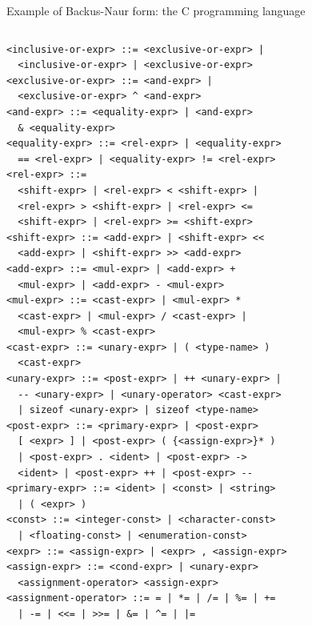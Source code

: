 \documentclass[aspectratio=169]{beamer}
\begin{document}
\begin{frame}[fragile]{Example of Backus-Naur form: the C programming language}
\begin{columns}[t]
\begin{verbatim}
<inclusive-or-expr> ::= <exclusive-or-expr> |
  <inclusive-or-expr> | <exclusive-or-expr>
<exclusive-or-expr> ::= <and-expr> |
  <exclusive-or-expr> ^ <and-expr>
<and-expr> ::= <equality-expr> | <and-expr>
  & <equality-expr>
<equality-expr> ::= <rel-expr> | <equality-expr>
  == <rel-expr> | <equality-expr> != <rel-expr>
<rel-expr> ::=
  <shift-expr> | <rel-expr> < <shift-expr> |
  <rel-expr> > <shift-expr> | <rel-expr> <=
  <shift-expr> | <rel-expr> >= <shift-expr>
<shift-expr> ::= <add-expr> | <shift-expr> <<
  <add-expr> | <shift-expr> >> <add-expr>
<add-expr> ::= <mul-expr> | <add-expr> +
  <mul-expr> | <add-expr> - <mul-expr>
<mul-expr> ::= <cast-expr> | <mul-expr> *
  <cast-expr> | <mul-expr> / <cast-expr> |
  <mul-expr> % <cast-expr>
<cast-expr> ::= <unary-expr> | ( <type-name> )
  <cast-expr>
<unary-expr> ::= <post-expr> | ++ <unary-expr> |
  -- <unary-expr> | <unary-operator> <cast-expr>
  | sizeof <unary-expr> | sizeof <type-name>
<post-expr> ::= <primary-expr> | <post-expr>
  [ <expr> ] | <post-expr> ( {<assign-expr>}* )
  | <post-expr> . <ident> | <post-expr> ->
  <ident> | <post-expr> ++ | <post-expr> --
<primary-expr> ::= <ident> | <const> | <string>
  | ( <expr> )
<const> ::= <integer-const> | <character-const>
  | <floating-const> | <enumeration-const>
<expr> ::= <assign-expr> | <expr> , <assign-expr>
<assign-expr> ::= <cond-expr> | <unary-expr>
  <assignment-operator> <assign-expr>
<assignment-operator> ::= = | *= | /= | %= | +=
  | -= | <<= | >>= | &= | ^= | |=
\end{verbatim}


\end{columns}
\end{frame}
\end{document}
